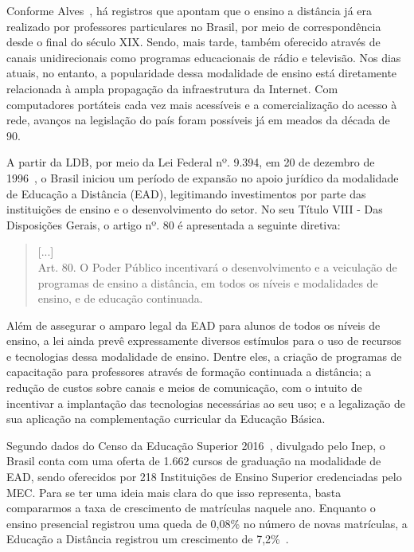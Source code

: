 

\label{chap:intro}
Conforme Alves~\cite{alves2009}, há registros que apontam que o ensino a distância já era realizado por professores particulares no Brasil, por meio de correspondência desde o final do século XIX. Sendo, mais tarde, também oferecido através de canais unidirecionais como programas educacionais de rádio e televisão. Nos dias atuais, no entanto, a popularidade dessa modalidade de ensino está diretamente relacionada à ampla propagação da infraestrutura da Internet. Com computadores portáteis cada vez mais acessíveis e a comercialização do acesso à rede, avanços na legislação do país foram possíveis já em meados da década de 90. 

A partir da \acrfull{LDB}, por  meio  da Lei Federal nº. 9.394, em 20 de dezembro de 1996~\cite{brasilLDB}, o Brasil iniciou um período de expansão no apoio jurídico da modalidade de Educação a Distância (EAD), legitimando investimentos por parte das instituições de ensino e o desenvolvimento do setor. No seu Título VIII - Das Disposições Gerais, o artigo nº. 80 é apresentada a seguinte diretiva:

\begin{quote}
[...]\\Art. 80. O Poder Público incentivará o desenvolvimento e a veiculação de programas de ensino a distância, em todos os níveis e modalidades de ensino, e de educação continuada.~\cite{brasilLDB}
\end{quote}%

Além de assegurar o amparo legal da EAD para alunos de todos os níveis de ensino, a lei ainda prevê expressamente diversos estímulos para o uso de recursos e tecnologias dessa modalidade de ensino. Dentre eles, a criação de programas de capacitação para professores através de formação continuada a distância; a redução de custos sobre canais e meios de comunicação, com o intuito de incentivar a implantação das tecnologias necessárias ao seu uso; e a legalização de sua aplicação na complementação curricular da Educação Básica. 

Segundo dados do Censo da Educação Superior 2016~\cite{inep2016sinopse}, divulgado pelo \acrfull{Inep}, o Brasil conta com uma oferta de 1.662 cursos de graduação na modalidade de EAD, sendo oferecidos por 218 Instituições de Ensino Superior credenciadas pelo \acrfull{MEC}. Para se ter uma ideia mais clara do que isso representa, basta compararmos a taxa de crescimento de matrículas naquele ano. Enquanto o ensino presencial registrou uma queda de 0,08{\%} no número de novas matrículas, a Educação a Distância registrou um crescimento de 7,2{\%}~\cite{exame@ead}.

